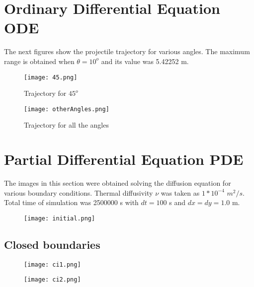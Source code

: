 \documentclass[]{article}
\begin{document}
\section{Ordinary Differential Equation ODE}

The next figures show the projectile trajectory for various angles. The maximum range is obtained when $\theta = 10^o$ and its value was 5.42252 m.

\begin{figure}[H]{
	\begin{center}
	\texttt{[image: 45.png]}
	\caption{Trajectory for $45^o$}
	\end{center}
}\end{figure}

\begin{figure}[H]{
	\begin{center}
	\texttt{[image: otherAngles.png]}
	\caption{Trajectory for all the angles}
	\end{center}
}\end{figure}

\section{Partial Differential Equation PDE}
The images in this section were obtained solving the diffusion equation for various boundary conditions. Thermal diffusivity $\nu$ was taken as $1*10^{-4}$ $m^2/s$. Total time of simulation was 2500000 s with $dt = 100$ s and $dx=dy=1.0$ m.

\begin{figure}[H]{
	\begin{center}
	\texttt{[image: initial.png]}
	\end{center}
}\end{figure}

\subsection{Closed boundaries}
	\begin{figure}[H]{
		\begin{center}
		\texttt{[image: ci1.png]}
		\end{center}
	}\end{figure}

	\begin{figure}[H]{
		\begin{center}
		\texttt{[image: ci2.png]}
		\end{center}
	}\end{figure}
	
\end{document}
